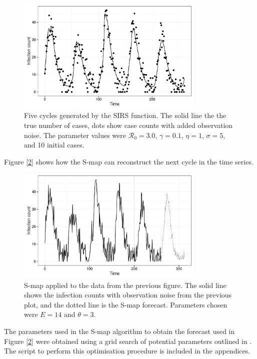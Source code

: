	\begin{figure}
        \centering
        \captionsetup{width=.8\linewidth}
        \includegraphics[width=0.8\textwidth]{./images/dataplot.pdf}
        \caption{Five cycles generated by the SIRS function. The solid line the the true number of cases, dots show case counts with added observation noise. The parameter values were $\mathcal{R}_0 = 3.0$, $\gamma = 0.1$, $\eta = 1$, $\sigma = 5$, and 10 initial cases. \label{sirsdataplot}}
    \end{figure}

    Figure [\ref{smap_project}] shows how the S-map can reconstruct the next cycle in the time series.

    \begin{figure}[H]
        \centering
        \captionsetup{width=.8\linewidth}
        \includegraphics[width=0.8\textwidth]{./images/smap-project.pdf}
        \caption{S-map applied to the data from the previous figure. The solid line shows the infection counts with observation noise from the previous plot, and the dotted line is the S-map forecast. Parameters chosen were $E = 14$ and $\theta = 3$. \label{smap_project}}
    \end{figure}

    The parameters used in the S-map algorithm to obtain the forecast used in Figure [\ref{smap_project}] were obtained using a grid search of potential parameters outlined in \cite{Glaser2014}. The script to perform this optimisation procedure is included in the appendices.


